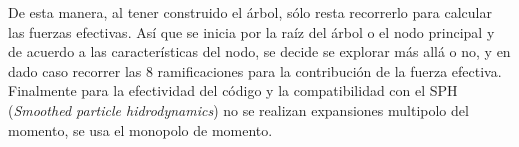 De esta manera, al tener construido el árbol, sólo resta recorrerlo para calcular las fuerzas efectivas. Así que se inicia por la raíz del árbol o el nodo principal y de acuerdo a las características del nodo, se decide se explorar más allá o no, y en dado caso recorrer las 8 ramificaciones para la contribución de la fuerza efectiva. Finalmente para la efectividad del código y la compatibilidad con el SPH (\textit{Smoothed particle hidrodynamics}) no se realizan expansiones multipolo del momento, se usa el monopolo de momento.



